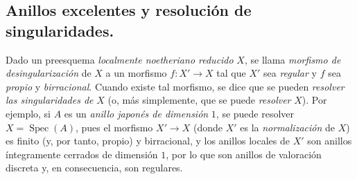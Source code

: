 \subsection{Anillos excelentes y resolución de singularidades.}
\label{subsection:IV.2.7.9-fr}

\begin{env}[7.9.1]
\label{IV.2.s7.9.1-fr}
Dado un preesquema \emph{localmente noetheriano reducido} $X$, se llama
\emph{morfismo de desingularización} de $X$ a un morfismo $f:X'\to X$
tal que $X'$ sea \emph{regular} y $f$ sea \emph{propio} y \emph{birracional}.
Cuando existe tal morfismo, se dice que se pueden \emph{resolver las
singularidades de} $X$ (o, más simplemente, que se puede \emph{resolver}
$X$). Por ejemplo, si $A$ es un \emph{anillo japonés de dimensión} $1$,
se puede resolver $X=\operatorname{Spec}(A)$, pues el morfismo $X'\to X$
(donde $X'$ es la \emph{normalización} de $X$) es finito (y, por tanto,
propio) y birracional, y los anillos locales de $X'$ son anillos
íntegramente cerrados de dimensión $1$, por lo que son anillos de
valoración discreta y, en consecuencia, son regulares.
\end{env}
